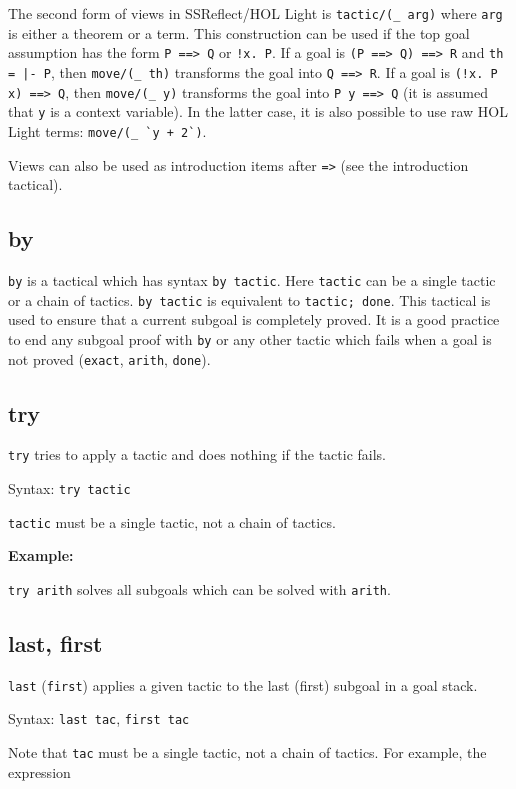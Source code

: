\documentclass[a4paper]{article}
\begin{document}
The second form of views in SSReflect/HOL Light is \verb$tactic/(_ arg)$ where \verb|arg| is either a theorem or a term. This construction can be used if the top goal assumption has the form \verb|P ==> Q| or \verb|!x. P|. If a goal is \verb|(P ==> Q) ==> R| and \verb$th = |- P$, then \verb|move/(_ th)| transforms the goal into \verb|Q ==> R|. If a goal is \verb|(!x. P x) ==> Q|, then \verb|move/(_ y)| transforms the goal into \verb|P y ==> Q| (it is assumed that \verb|y| is a context variable). In the latter case, it is also possible to use raw HOL Light terms: \verb|move/(_ `y + 2`)|.

Views can also be used as introduction items after \verb|=>| (see the introduction tactical).



\subsection{by}
\verb|by| is a tactical which has syntax \verb|by tactic|. Here \verb|tactic| can be a single tactic or a chain of tactics. \verb|by tactic| is equivalent to \verb|tactic; done|. This tactical is used to ensure that a current subgoal is completely proved. It is a good practice to end any subgoal proof with \verb|by| or any other tactic which fails when a goal is not proved (\verb|exact|, \verb|arith|, \verb|done|).


\subsection{try}
\verb|try| tries to apply a tactic and does nothing if the tactic fails.

Syntax: \verb|try tactic|

\verb|tactic| must be a single tactic, not a chain of tactics.

{\bf Example:}

\verb|try arith| solves all subgoals which can be solved with \verb|arith|.


\subsection{last, first}
\verb|last| (\verb|first|) applies a given tactic to the last (first) subgoal in a goal stack.

Syntax:
\verb|last tac|, \verb|first tac|

Note that \verb|tac| must be a single tactic, not a chain of tactics. For example, the expression 
\end{document}

